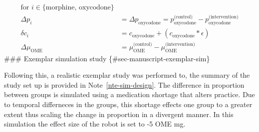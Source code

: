 \documentclass[
  letterpaper,
  DIV=11,
  numbers=noendperiod]{scrreprt}
\begin{document}
\[
\begin{align}
\text{for } i \in \{\text{morphine, oxycodone} \} \\[1em]
\Delta p_i &= \Delta p_{\text{oxycodone}} = p_{\text{oxycodone}}^{\text{(control)}} - p_{\text{oxycodone}}^{\text{(intervention)}} \\
\delta c_i &= c_{\text{oxycodone}} + (c_{\text{oxycodone}} * \epsilon) \\
\Delta \mu_{\text{OME}} &= \mu_{\text{OME}}^{\text{(control)}} - \mu_{\text{OME}}^{\text{(intervention)}}
\end{align}
\] \#\#\# Exemplar simulation study \{\#sec-manuscript-exemplar-sim\}

Following this, a realistic exemplar study was performed to, the summary
of the study set up is provided in Note~\ref{nte-sim-design}. The
difference in proportion between groups is simulated using a medication
shortage that alters practice. Due to temporal differneces in the
groups, this shortage effects one group to a greater extent thus scaling
the change in proportion in a divergent manner. In this simulation the
effect size of the robot is set to -5 OME mg.
\end{document}
